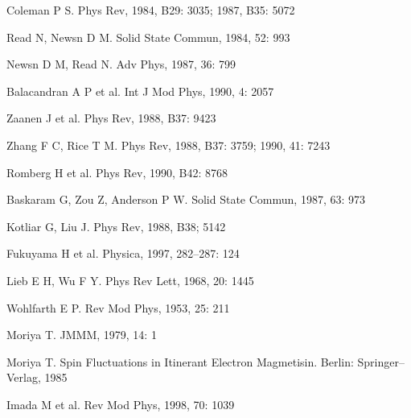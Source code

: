 \begin{canKao}
\begin{enumerate}[label={[\arabic*]}, leftmargin=2.2em, itemsep=0pt]
\item Coleman P S. Phys Rev, 1984, B29: 3035; 1987, B35: 5072
\item Read N, Newsn D M. Solid State Commun, 1984, 52: 993
\item Newsn D M, Read N. Adv Phys, 1987, 36: 799
\item Balacandran A P et al. Int J Mod Phys, 1990, 4: 2057
\item Zaanen J et al. Phys Rev, 1988, B37: 9423
\item Zhang F C, Rice T M. Phys Rev, 1988, B37: 3759; 1990, 41: 7243
\item Romberg H et al. Phys Rev, 1990, B42: 8768
\item Baskaram G, Zou Z, Anderson P W. Solid State Commun, 1987, 63: 973
\item Kotliar G, Liu J. Phys Rev, 1988, B38; 5142
\item Fukuyama H et al. Physica, 1997, 282--287: 124
\item Lieb E H, Wu F Y. Phys Rev Lett, 1968, 20: 1445
\item Wohlfarth E P. Rev Mod Phys, 1953, 25: 211
\item Moriya T. JMMM, 1979, 14: 1
\item Moriya T. Spin Fluctuations in Itinerant Electron Magmetisin. Berlin: Springer--Verlag, 1985
\item Imada M et al. Rev Mod Phys, 1998, 70: 1039
\end{enumerate}
\end{canKao}
